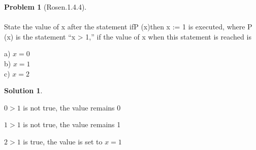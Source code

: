 \documentclass{article}
\theoremstyle{definition}
\newtheorem*{problem}{Problem}
\newtheorem*{solution}{Solution}
\begin{document}
\begin{problem}[Rosen.1.4.4]\ \\
\ \\
State the value of x after the statement ifP (x)then x := 1 is executed, where P (x) is the statement “x > 1,” if the value of x when this statement is reached is\ \\
\begin{compactenum}
\renewcommand{\theenumi}{\alph{enumi}}
a) $x = 0$\ \\
b) $x = 1$\ \\
c) $x = 2$\ \\

\end{compactenum}
\end{problem}

\begin{solution}\ \\

\begin{compactenum}
\renewcommand{\theenumi}{\alph{enumi}}  
\item $0 > 1$ is not true, the value remains 0
\item $1 > 1$ is not true, the value remains 1
\item $2 > 1$ is true, the value is set to $x=1$





\end{compactenum}
\end{solution}
\end{document}
